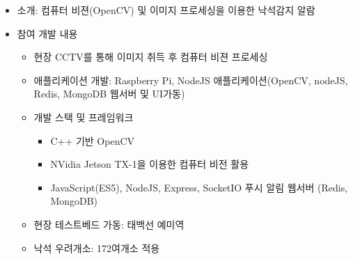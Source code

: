 \begin{itemize}[label=]
	\item
	      소개: 컴퓨터 비젼(OpenCV) 및 이미지 프로세싱을 이용한 낙석감지 알람
	\item 참여 개발 내용
	      \begin{itemize}[label=]
		      \item 현장 CCTV를 통해 이미지 취득 후 컴퓨터 비젼 프로세싱
		      \item 애플리케이션 개발: Raspberry Pi, NodeJS 애플리케이션(OpenCV, nodeJS, Redis, MongoDB 웹서버 및 UI가동)
		      \item 개발 스택 및 프레임워크
		            \begin{itemize}
			            \item C++ 기반 OpenCV
			            \item NVidia Jetson TX-1을 이용한 컴퓨터 비전 활용
			            \item JavaScript(ES5), NodeJS, Express, SocketIO 푸시 알림 웹서버 (Redis, MongoDB)
		            \end{itemize}
		      \item 현장 테스트베드 가동: 태백선 예미역
					\item 낙석 우려개소: 172여개소 적용
		      

\end{itemize}
\end{itemize}
